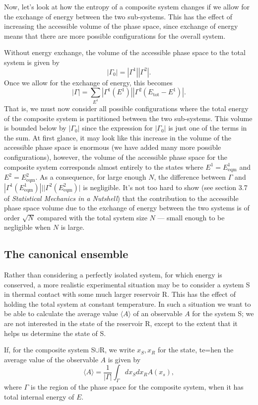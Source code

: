 Now, let's look at how the entropy of a composite system changes if we allow for the exchange of energy between the two sub-systems. This has the effect of increasing the accessible volume of the phase space, since exchange of energy means that there are more possible configurations for the overall system.

Without energy exchange, the volume of the accessible phase space to the total system is given by
$$
	|\Gamma_0| = |\Gamma^1||\Gamma^2|.
$$
Once we allow for the exchange of energy, this becomes
$$
	|\Gamma| = \sum_{E^1}|\Gamma^1(E^1)||\Gamma^2(E_\text{tot}-E^1)|.
$$
That is, we must now consider all possible configurations where the total energy of the composite system is partitioned between the two sub-systems. This volume is bounded below by $|\Gamma_0|$ since the expression for $|\Gamma_0|$ is just one of the terms in the sum. At first glance, it may look like this increase in the volume of the accessible phase space is enormous (we have added many more possible configurations), however, the volume of the accessible phase space for the composite system corresponds almost entirely to the states where $E^1=E^1_\text{eqm}$ and $E^2=E^2_\text{eqm}$. As a consequence, for large enough $N$, the difference between $\Gamma$ and $|\Gamma^1(E^1_\text{eqm})|||\Gamma^2(E^2_\text{eqm})|$ is negligible. It's not too hard to show (see section 3.7 of \emph{Statistical Mechanics in a Nutshell}) that the contribution to the accessible phase space volume due to the exchange of energy between the two systems is of order $\sqrt{N}$ compared with the total system size $N$ --- small enough to be negligible when $N$ is large.

\subsection{The canonical ensemble}

Rather than considering a perfectly isolated system, for which energy is conserved, a more realistic experimental situation may be to consider a system S in thermal contact with some much larger reservoir R. This has the effect of holding the total system at constant temperature. In such a situation we want to be able to calculate the average value $\langle A\rangle$ of an observable $A$ for the system S; we are not interested in the state of the reservoir R, except to the extent that it helps us determine the state of S.

If, for the composite system S$\cup$R, we write $x_S,x_R$ for the state, te=hen the average value of the observable $A$ is given by
$$
	\langle A\rangle = \frac{1}{|\Gamma|}\int_{\Gamma}dx_Sdx_RA(x_s),
$$
where $\Gamma$ is the region of the phase space for the composite system, when it has total internal energy of $E$.

